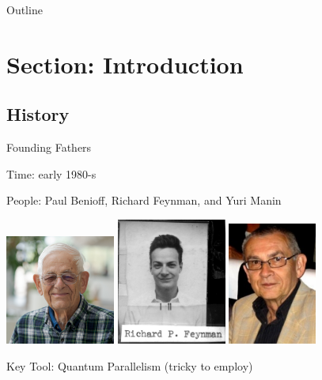 \documentclass[
handout,
ignorenonframetext,hyperref={pdftex,unicode},xcolor=dvipsnames]{beamer}
\begin{document}
\begin{frame}{Outline}
\tableofcontents
\end{frame}


\section{Section: Introduction}

\subsection{History}

\begin{frame}{Founding Fathers}

  Time: early 1980-s

  People: Paul Benioff, Richard Feynman, and Yuri Manin

  \vspace{.3cm}

  \includegraphics[width=3.6cm]{./pics/benioff.jpg}
  \hfill
  \includegraphics[width=3.6cm]{./pics/feynman.jpg}
  \hfill
  \includegraphics[width=2.9cm]{./pics/manin.jpg}

  \pause
  \vspace{3mm}
  Key Tool: \alert{Quantum Parallelism} \pause (tricky to employ)

\end{frame}
\end{document}

